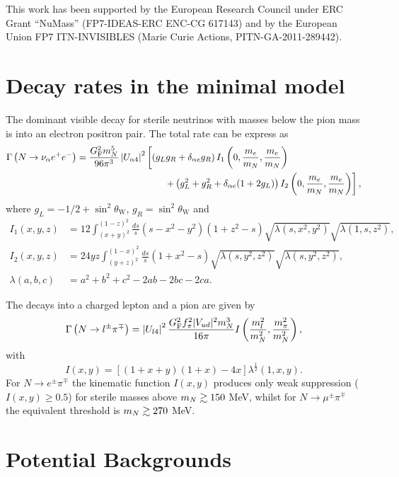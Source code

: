 \documentclass[11pt, a4paper]{article}
\def\ster{\ensuremath N}
\begin{document}
This work has been supported by the European Research Council under ERC Grant
“NuMass” (FP7-IDEAS-ERC ENC-CG 617143) and by the European Union FP7
ITN-INVISIBLES (Marie Curie Actions, PITN-GA-2011-289442).

\appendix

\section{\label{app:decayrates}Decay rates in the minimal model}

The dominant visible decay for sterile neutrinos with masses below the pion
mass is into an electron positron pair. The total rate can be express as
%
\begin{align*} \Gamma\left(\ster\to \nu_\alpha e^+e^-\right) =
\frac{G_\text{F}^2m_\ster^5}{96\pi^3}\left|U_{\alpha 4}\right|^2&\left[\left( g_Lg_R + \delta_{\alpha e}g_R\right)I_1\left(0,\frac{m_e}{m_\ster}, \frac{
m_e}{m_\ster}\right)\right.\\ 
&\left.\qquad + \left(g_L^2 + g_R^2 + \delta_{\alpha e}(1+2g_L)\right)I_2\left(0,\frac{m_e}{m_\ster},\frac{m_e}{m_\ster}\right)\right],  \end{align*}
%
where $g_L = -1/2 + \sin^2\theta_\text{W}$, $g_R = \sin^2\theta_\text{W}$ and
% 
\begin{align*} I_1(x,y,z) & =12 \int_{(x+y)^2}^{(1-z)^2}
\frac{ds}{s}(s-x^2-y^2)(1+z^2-s)\sqrt{\lambda(s,x^2,y^2)}\sqrt{\lambda(1,s,z^2)},\\
I_2(x,y,z)& =24yz\int_{(y+z)^2}^{(1-x)^2}\frac{ds}{s}\left(1+x^2-s\right)\sqrt{\lambda\left(s,y^2,z^2\right)}\sqrt{\lambda\left(s,y^2,z^2\right)},\\
\lambda(a,b,c) &= a^2+b^2+c^2 - 2ab-2bc-2ca.  \end{align*}
%

The decays into a charged lepton and a pion are given by 
%
\[ \Gamma\left(\ster\to l^\pm\pi^\mp\right) =
\left|U_{l4}\right|^2\frac{G_\text{F}^2f_\pi^2 |V_{ud}|^2
m_\ster^3}{16\pi}I\left(\frac{m_l^2}{m_\ster^2} ,
\frac{m_\pi^2}{m_\ster^2}\right) , \] 
%
with \[ I(x,y) = \left[ \left( 1+x+y\right) \left(1+x\right) -4 x\right]
\lambda^\frac{1}{2}\left(1,x,y\right).  \]
%
For $N\to e^\pm\pi^\mp$ the kinematic function $I(x,y)$ produces only weak suppression ($I(x,y)\geq 0.5$) for sterile masses above $m_\ster\gtrsim 150$ MeV, whilst for $N\to
\mu^\pm\pi^\mp$ the equivalent threshold is $m_\ster\gtrsim 270$ MeV.

\section{Potential Backgrounds\label{app:bg}}
\end{document}
